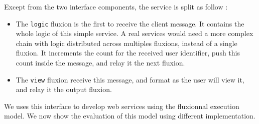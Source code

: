 Except from the two interface components, the service is split as follow :
\begin{itemize}
  \item The \texttt{logic} fluxion is the first to receive the client message.
  It contains the whole logic of this simple service.
  A real services would need a more complex chain with logic distributed across multiples fluxions, instead of a single fluxion.
  It increments the count for the received user identifier, push this count inside the message, and relay it the next fluxion.
  \item The \texttt{view} fluxion receive this message, and format as the user will view it, and relay it the output fluxion.
\end{itemize}

We uses this interface to develop web services using the fluxionnal execution model.
We now show the evaluation of this model using different implementation.
